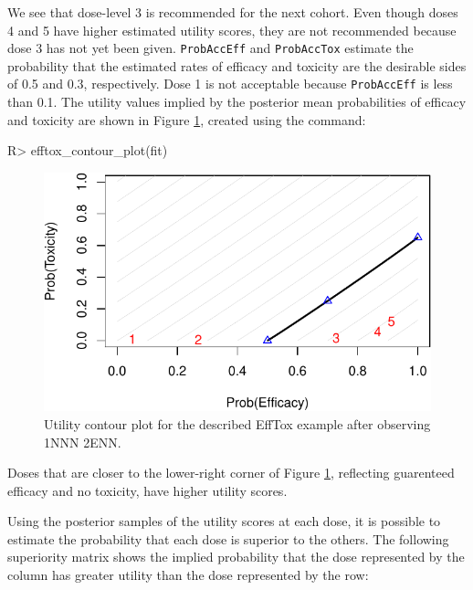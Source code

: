 \documentclass[article]{jss}
\begin{document}
We see that dose-level 3 is recommended for the next cohort. Even though
doses 4 and 5 have higher estimated utility scores, they are not
recommended because dose 3 has not yet been given. \texttt{ProbAccEff}
and \texttt{ProbAccTox} estimate the probability that the estimated
rates of efficacy and toxicity are the desirable sides of 0.5 and 0.3,
respectively. Dose 1 is not acceptable because \texttt{ProbAccEff} is
less than 0.1. The utility values implied by the posterior mean
probabilities of efficacy and toxicity are shown in Figure
\ref{fig:efftox_contours}, created using the command:

\begin{CodeChunk}

\begin{CodeInput}
R> efftox_contour_plot(fit)
\end{CodeInput}
\begin{figure}

{\centering \includegraphics{trialr_files/figure-latex/efftox_contours-1} 

}

\caption[Utility contour plot for the described EffTox example after observing 1NNN 2ENN]{Utility contour plot for the described EffTox example after observing 1NNN 2ENN.}\label{fig:efftox_contours}
\end{figure}
\end{CodeChunk}

Doses that are closer to the lower-right corner of Figure
\ref{fig:efftox_contours}, reflecting guarenteed efficacy and no
toxicity, have higher utility scores.

Using the posterior samples of the utility scores at each dose, it is
possible to estimate the probability that each dose is superior to the
others. The following superiority matrix shows the implied probability
that the dose represented by the column has greater utility than the
dose represented by the row:
\end{document}
